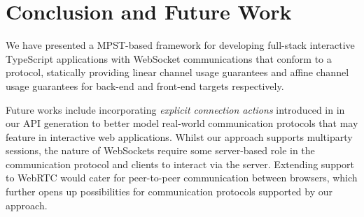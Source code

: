 \section{Conclusion and Future Work}
We have presented a MPST-based framework for developing full-stack interactive
TypeScript applications with WebSocket communications that conform to a
protocol, statically providing linear channel usage guarantees and affine
channel usage guarantees for back-end and front-end targets respectively.

Future works include incorporating \textit{explicit connection actions}
introduced in \cite{ExplicitConnections} in our API generation to better model
real-world communication protocols that may feature in interactive web
applications.
Whilst our approach supports multiparty sessions, the nature of
WebSockets require some server-based role in the communication protocol and
clients to interact via the server.
Extending support to WebRTC \cite{WebRTC} would
cater for peer-to-peer communication between browsers, which further opens up
possibilities for communication protocols supported by our approach.


